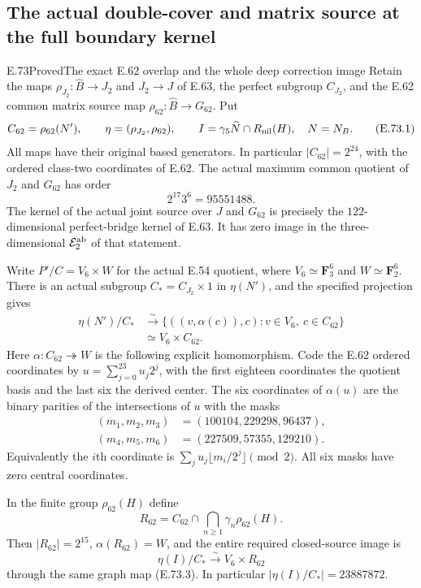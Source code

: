 \subsection{The actual double-cover and matrix source at the full boundary kernel}

\begin{statement}{E.73}{Proved}{The exact E.62 overlap and the whole deep correction image}
Retain the maps $\rho_{J_2}:\widehat B\to J_2$ and
$J_2\to J$ of E.63, the perfect subgroup $C_{J_2}$,
and the E.62 common matrix source map
$\rho_{62}:\widehat B\to G_{62}$. Put
\[
 C_{62}=\rho_{62}(N'),\qquad
 \eta=(\rho_{J_2},\rho_{62}),\qquad
 I=\gamma_5\widehat N\cap R_{\rm nil}(H),
 \quad N=N_B.
 \tag{E.73.1}
\]
All maps have their original based generators. In particular
$|C_{62}|=2^{24}$, with the ordered class-two coordinates of
E.62. The actual maximum common quotient of $J_2$ and $G_{62}$
has order
\[
                         2^{17}3^6=95551488.
 \tag{E.73.2}
\]
The kernel of the actual joint source over $J$ and $G_{62}$
is precisely the $122$-dimensional perfect-bridge kernel of
E.63. It has zero image in the three-dimensional
$\mathcal E_2^{\rm ab}$ of that statement.

Write $P'/C=V_6\times W$ for the actual E.54 quotient,
where $V_6\simeq\mathbf F_3^6$ and $W\simeq\mathbf F_2^6$.
There is an actual subgroup $C_*=C_{J_2}\times1$ in
$\eta(N')$, and the specified projection gives
\[
 \begin{aligned}
 \eta(N')/C_*&\xrightarrow{\ \sim\ }
 \{((v,\alpha(c)),c):v\in V_6,\ c\in C_{62}\}\\
 &\simeq V_6\times C_{62}.
 \end{aligned}
 \tag{E.73.3}
\]
Here $\alpha:C_{62}\twoheadrightarrow W$ is the following
explicit homomorphism. Code the E.62 ordered coordinates by
$u=\sum_{j=0}^{23}u_j2^j$, with the first eighteen coordinates
the quotient basis and the last six the derived center.
The six coordinates of $\alpha(u)$ are the binary parities
of the intersections of $u$ with the masks
\[
 \begin{split}
 (m_1,m_2,m_3)&=(100104,229298,96437),\\
 (m_4,m_5,m_6)&=(227509,57355,129210).
 \end{split}
 \tag{E.73.4}
\]
Equivalently the $i$th coordinate is
$\sum_j u_j\lfloor m_i/2^j\rfloor\pmod2$.
All six masks have zero central coordinates.

In the finite group $\rho_{62}(H)$ define
\[
 R_{62}=C_{62}\cap\bigcap_{n\ge1}\gamma_n\rho_{62}(H).
 \tag{E.73.5}
\]
Then $|R_{62}|=2^{15}$, $\alpha(R_{62})=W$, and the
entire required closed-source image is
\[
                 \eta(I)/C_*
                   \xrightarrow{\ \sim\ }V_6\times R_{62}
 \tag{E.73.6}
\]
through the same graph map (E.73.3). In particular
$|\eta(I)/C_*|=23887872$.


\end{statement}
